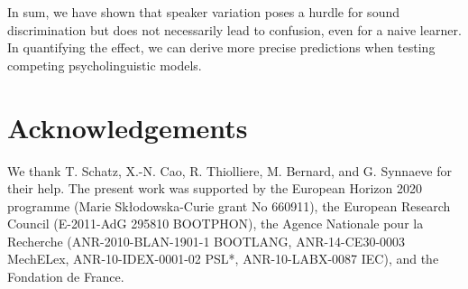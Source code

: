 \documentclass[10pt,letterpaper]{article}
\begin{document}
In sum, we have shown that speaker variation poses a hurdle for sound discrimination but does not necessarily lead to confusion, even for a naive learner. In quantifying the effect, we can derive more precise predictions when testing competing psycholinguistic models. 


\section{Acknowledgements}

We thank T. Schatz, X.-N. Cao, R. Thiolliere, M. Bernard, and G. Synnaeve for their help. The present work was supported by the European Horizon 2020 programme (Marie Sk\l odowska-Curie grant No 660911), the European Research Council (E-2011-AdG 295810 BOOTPHON), the Agence Nationale pour la Recherche (ANR-2010-BLAN-1901-1 BOOTLANG, ANR-14-CE30-0003 MechELex, ANR-10-IDEX-0001-02 PSL*, ANR-10-LABX-0087 IEC), and the Fondation de France. %





\setlength{\bibleftmargin}{.125in}
\setlength{\bibindent}{-\bibleftmargin}


\end{document}
